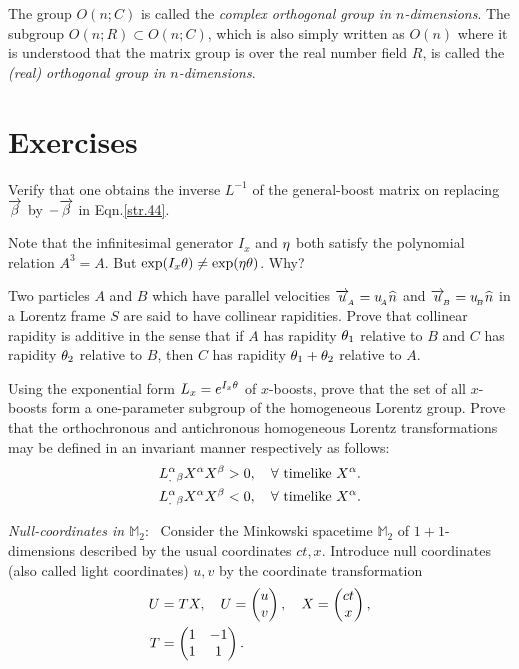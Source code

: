 \begin{small}
\dfn The group $O(n;C)$ is called the \textsl{complex  
orthogonal group in  $n$-dimensions}. The subgroup  $O(n;R) 
\subset O(n;C)$, which is also simply written as $O(n)$ 
where it is understood that the matrix group is over the 
real number field $R$, is called the \textsl{(real) 
orthogonal group in $n$-dimensions}.

\vspace{-.2cm}

\section*{Exercises}

\exise  Verify that one obtains the inverse $L^{-1}$ of 
the  general-boost matrix on replacing $\overrightarrow{{\beta}}$ by 
$-\overrightarrow{{\beta}}$ in Eqn.\eqref{str.44}.

\exise  Note that the infinitesimal generator $I_x$ and 
${\eta}$ both satisfy the polynomial relation  $A^3=A$. 
But  $\exp(I_x{\theta}) \neq \exp ({\eta}{\theta})$. Why?

\exise  Two particles $A$ and $B$ which have parallel 
velocities $\overrightarrow{u}_{_{\hspace*{-1.5pt}{A}}} ={u}_{_{\hspace*{-1.5pt}{A}}}{\widehat{n}}$ and 
$\overrightarrow{u}_{_{\hspace*{-1.5pt}{B}}} ={u}_{_{\hspace*{-1.5pt}{B}}}{\widehat{n}}$ in a Lorentz frame 
$S$ are said to have {collinear rapidities}. Prove that 
collinear rapidity is {additive} in the sense that if $A$ 
has rapidity ${\theta}_1 $ relative to $B$ and $C$ 
has rapidity ${\theta}_2$ relative to $B$, then $C$ has 
rapidity $ {\theta}_1 +{\theta}_2$ relative to $A$.

\exise  Using the exponential form $L_x =e^{I_x{\theta}}$ of 
$x$-boosts, prove that {the set of all $x$-boosts form a 
one-parameter subgroup of the homogeneous Lorentz group}.
\exise Prove that the orthochronous and  antichronous 
homogeneous Lorentz transformations may be defined in an 
invariant manner respectively as follows:
\begin{align}
L{{}_{.}^{{\alpha}}}{{}_{{\beta}}}X^{{\alpha}} X^{{\beta}}
>0,\quad \forall \text{ timelike } X^{{\alpha}} .\label{str.72} \\
L{{}_{.}^{{\alpha}}}{{}_{{\beta}}}X^{{\alpha}} X^{{\beta}}
<0,\quad \forall \text{ timelike } X^{{\alpha}} .\label{str.73} 
\end{align}

\exise \textsl{Null-coordinates in  $\mathbb{M}_2$}:~ 
Consider 
the  Minkowski spacetime $\mathbb{M}_2$ of $1+1$-dimensions 
described by the usual coordinates $ct,x $. Introduce null 
coordinates (also called light coordinates) $u,v $ by the 
coordinate transformation
\begin{align}\label{str.74}
 U&=T X,\quad U=\begin{pmatrix}
u\\v\end{pmatrix} ,\quad X=\begin{pmatrix}
ct\\x\end{pmatrix} ,\notag \\ T&=\begin{pmatrix} 1
&-1\\1 &1\end{pmatrix} .
\end{align}


\end{small}

